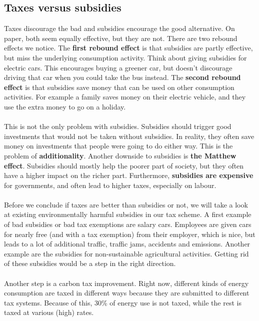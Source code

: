 \documentclass[../summary.tex]{subfiles}
\begin{document}
	\subsection{Taxes versus subsidies}
	Taxes discourage the bad and subsidies encourage the good alternative. On paper, both seem equally effective, but they are not. There are two rebound effects we notice. The \textbf{first rebound effect} is that subsidies are partly effective, but miss the underlying consumption activity. Think about giving subsidies for electric cars. This encourages buying a greener car, but doesn't discourage driving that car when you could take the bus instead. The \textbf{second rebound effect} is that subsidies save money that can be used on other consumption activities. For example a family saves money on their electric vehicle, and they use the extra money to go on a holiday.
	\\\\
	This is not the only problem with subsidies. Subsidies should trigger good investments that would not be taken without subsidies. In reality, they often save money on investments that people were going to do either way. This is the problem of \textbf{additionality}. Another downside to subsidies is \textbf{the Matthew effect}. Subsidies should mostly help the poorer part of society, but they often have a higher impact on the richer part. Furthermore, \textbf{subsidies are expensive} for governments, and often lead to higher taxes, especially on labour.
	\\\\
	Before we conclude if taxes are better than subsidies or not, we will take a look at existing environmentally harmful subsidies in our tax scheme. A first example of bad subsidies or bad tax exemptions are salary cars. Employees are given cars for nearly free (and with a tax exemption) from their employer, which is nice, but leads to a lot of additional traffic, traffic jams, accidents and emissions. Another example are the subsidies for non-sustainable agricultural activities. Getting rid of these subsidies would be a step in the right direction.
	\\\\
	Another step is a carbon tax improvement. Right now, different kinds of energy consumption are taxed in different ways because they are submitted to different tax systems. Because of this, 30\% of energy use is not taxed, while the rest is taxed at various (high) rates.
	
\end{document}
